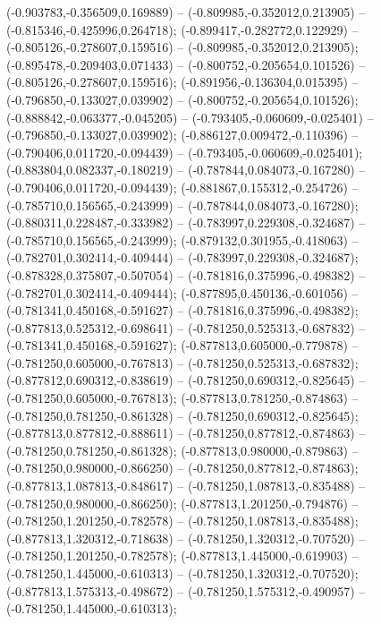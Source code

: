  (-0.903783,-0.356509,0.169889) -- (-0.809985,-0.352012,0.213905) -- (-0.815346,-0.425996,0.264718);
 (-0.899417,-0.282772,0.122929) -- (-0.805126,-0.278607,0.159516) -- (-0.809985,-0.352012,0.213905);
 (-0.895478,-0.209403,0.071433) -- (-0.800752,-0.205654,0.101526) -- (-0.805126,-0.278607,0.159516);
 (-0.891956,-0.136304,0.015395) -- (-0.796850,-0.133027,0.039902) -- (-0.800752,-0.205654,0.101526);
 (-0.888842,-0.063377,-0.045205) -- (-0.793405,-0.060609,-0.025401) -- (-0.796850,-0.133027,0.039902);
 (-0.886127,0.009472,-0.110396) -- (-0.790406,0.011720,-0.094439) -- (-0.793405,-0.060609,-0.025401);
 (-0.883804,0.082337,-0.180219) -- (-0.787844,0.084073,-0.167280) -- (-0.790406,0.011720,-0.094439);
 (-0.881867,0.155312,-0.254726) -- (-0.785710,0.156565,-0.243999) -- (-0.787844,0.084073,-0.167280);
 (-0.880311,0.228487,-0.333982) -- (-0.783997,0.229308,-0.324687) -- (-0.785710,0.156565,-0.243999);
 (-0.879132,0.301955,-0.418063) -- (-0.782701,0.302414,-0.409444) -- (-0.783997,0.229308,-0.324687);
 (-0.878328,0.375807,-0.507054) -- (-0.781816,0.375996,-0.498382) -- (-0.782701,0.302414,-0.409444);
 (-0.877895,0.450136,-0.601056) -- (-0.781341,0.450168,-0.591627) -- (-0.781816,0.375996,-0.498382);
 (-0.877813,0.525312,-0.698641) -- (-0.781250,0.525313,-0.687832) -- (-0.781341,0.450168,-0.591627);
 (-0.877813,0.605000,-0.779878) -- (-0.781250,0.605000,-0.767813) -- (-0.781250,0.525313,-0.687832);
 (-0.877812,0.690312,-0.838619) -- (-0.781250,0.690312,-0.825645) -- (-0.781250,0.605000,-0.767813);
 (-0.877813,0.781250,-0.874863) -- (-0.781250,0.781250,-0.861328) -- (-0.781250,0.690312,-0.825645);
 (-0.877813,0.877812,-0.888611) -- (-0.781250,0.877812,-0.874863) -- (-0.781250,0.781250,-0.861328);
 (-0.877813,0.980000,-0.879863) -- (-0.781250,0.980000,-0.866250) -- (-0.781250,0.877812,-0.874863);
 (-0.877813,1.087813,-0.848617) -- (-0.781250,1.087813,-0.835488) -- (-0.781250,0.980000,-0.866250);
 (-0.877813,1.201250,-0.794876) -- (-0.781250,1.201250,-0.782578) -- (-0.781250,1.087813,-0.835488);
 (-0.877813,1.320312,-0.718638) -- (-0.781250,1.320312,-0.707520) -- (-0.781250,1.201250,-0.782578);
 (-0.877813,1.445000,-0.619903) -- (-0.781250,1.445000,-0.610313) -- (-0.781250,1.320312,-0.707520);
 (-0.877813,1.575313,-0.498672) -- (-0.781250,1.575312,-0.490957) -- (-0.781250,1.445000,-0.610313);
